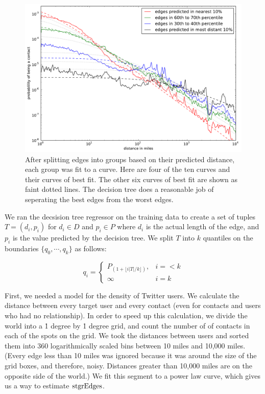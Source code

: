 \begin{figure}[tb]
\centering
\includegraphics[width=\linewidth]{figures/near_prob_fit.pdf}
\caption{
After splitting edges into groups based on their predicted distance, each group
was fit to a curve. Here are four of the ten curves and their curves of best
fit. The other six curves of best fit are shown as faint dotted lines. The
decision tree does a reasonable job of seperating the best edges from the worst
edges.
}
\label{fig:NearProbFit}
\end{figure}


We ran the decsision tree regressor on the training data to create a set of
tuples $T = (d_i, p_i)$ for $d_i \in D$ and $p_i \in P$ where $d_i$ is the
actual length of the edge, and $p_i$ is the value predicted by the decision
tree.
%
We split $T$ into $k$ quantiles on the boundaries $\{q_0,\cdots,q_k\}$ as
follows:

\[
    q_i =
    \begin{cases}
        P_{(1+\lfloor i|T|/k \rfloor)}, & i=<k \\
        \infty & i=k
    \end{cases}
\]

First, we needed a model for the density of Twitter users.
We calculate the distance between every target user and every contact
(even for contacts and users who had no relationship).
%
In order to speed up this calculation, we divide the world into a \.1 degree
by \.1 degree grid, and count the number of of contacts in each of the spots
on the grid.
%
We took the distances between users and sorted them into 360 logarithmically
scaled bins between 10 miles and 10,000 miles.
%
(Every edge less than 10 miles was ignored because it was around the size of
the grid boxes, and therefore, noisy. Distances greater than 10,000 miles are
on the opposite side of the world.)
%
We fit this segment to a power law curve, which gives us a way to estimate
$\operatorname{stgrEdges}$.


